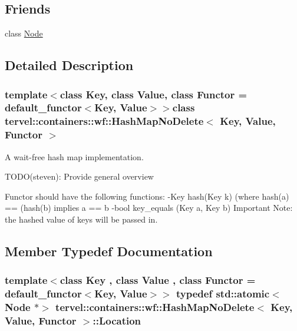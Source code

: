 \subsection*{Friends}
\begin{DoxyCompactItemize}
\item 
class \hyperlink{classtervel_1_1containers_1_1wf_1_1_hash_map_no_delete_a6db9d28bd448a131448276ee03de1e6d}{Node}
\end{DoxyCompactItemize}


\subsection{Detailed Description}
\subsubsection*{template$<$class Key, class Value, class Functor = default\+\_\+functor$<$\+Key, Value$>$$>$class tervel\+::containers\+::wf\+::\+Hash\+Map\+No\+Delete$<$ Key, Value, Functor $>$}

A wait-\/free hash map implementation. 

T\+O\+D\+O(steven)\+: Provide general overview

Functor should have the following functions\+: -\/\+Key hash(\+Key k) (where hash(a) == (hash(b) implies a == b -\/bool key\+\_\+equals (Key a, Key b) Important Note\+: the hashed value of keys will be passed in. 

\subsection{Member Typedef Documentation}
\hypertarget{classtervel_1_1containers_1_1wf_1_1_hash_map_no_delete_af5b18c3806eb5b2d39693075d8c70ade}{}
\subsubsection[{Location}]{\setlength{\rightskip}{0pt plus 5cm}template$<$class Key , class Value , class Functor  = default\+\_\+functor$<$\+Key, Value$>$$>$ typedef std\+::atomic$<${\bf Node} $\ast$$>$ {\bf tervel\+::containers\+::wf\+::\+Hash\+Map\+No\+Delete}$<$ Key, {\bf Value}, Functor $>$\+::{\bf Location}\hspace{0.3cm}{\ttfamily [private]}}\label{classtervel_1_1containers_1_1wf_1_1_hash_map_no_delete_af5b18c3806eb5b2d39693075d8c70ade}


